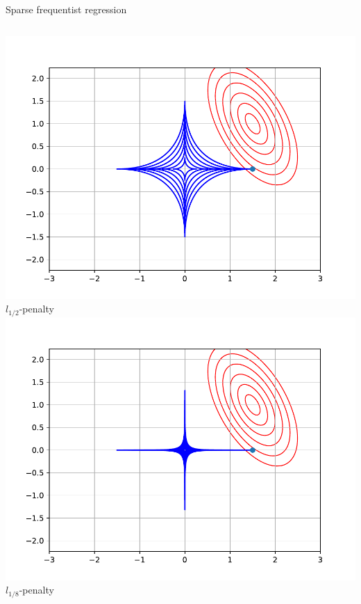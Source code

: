 \documentclass[9pt]{beamer}
\begin{document}
\begin{frame}{Sparse frequentist regression}
\begin{columns}
    \begin{column}{0.25\textwidth}
      \centering
      \includegraphics[width=\textwidth]{sparse/l12_ball} \\
      \(l_{1/2}\)-penalty \\
      \includegraphics[width=\textwidth]{sparse/l18_ball} \\
      \(l_{1/8}\)-penalty
    \end{column}
  \end{columns}
\end{frame}
\end{document}
